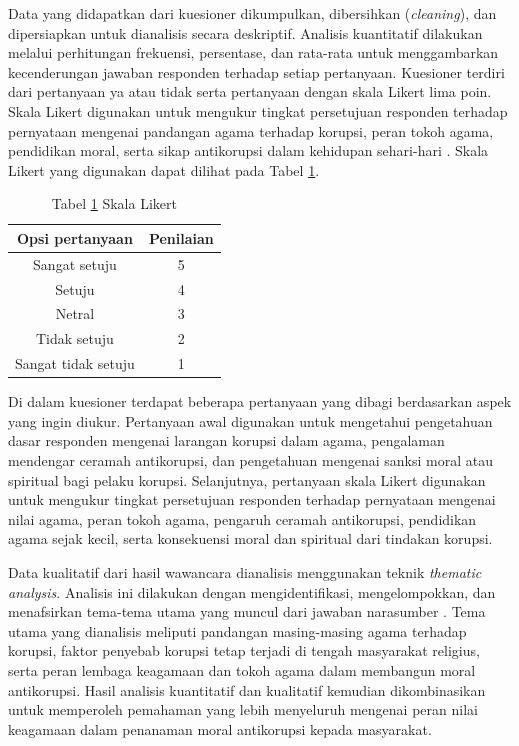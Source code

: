 Data yang didapatkan dari kuesioner dikumpulkan, dibersihkan (\textit{cleaning}), dan dipersiapkan untuk dianalisis secara deskriptif. Analisis kuantitatif dilakukan melalui perhitungan frekuensi, persentase, dan rata-rata untuk menggambarkan kecenderungan jawaban responden terhadap setiap pertanyaan. Kuesioner terdiri dari pertanyaan ya atau tidak serta pertanyaan dengan skala Likert lima poin. Skala Likert digunakan untuk mengukur tingkat persetujuan responden terhadap pernyataan mengenai pandangan agama terhadap korupsi, peran tokoh agama, pendidikan moral, serta sikap antikorupsi dalam kehidupan sehari-hari \citep{alkharusi2022}. Skala Likert yang digunakan dapat dilihat pada Tabel \ref{tab:TabelSkalalikert}.
\begin{table}[h]
    \centering
    \vspace{10pt} %
    \captionsetup{labelformat=empty}
    \caption[Skala Likert]{Tabel \ref{tab:TabelSkalalikert} Skala Likert}
    \begin{tabular}{ |c|c| }
        \hline
        \textbf{Opsi pertanyaan} & \textbf{Penilaian} \\
        \hline
        Sangat setuju & 5 \\
        \hline
        Setuju & 4 \\
        \hline
        Netral & 3 \\
        \hline
        Tidak setuju & 2 \\
        \hline
        Sangat tidak setuju & 1 \\
        \hline
    \end{tabular}
    \label{tab:TabelSkalalikert}
\end{table}

\newpage

\begin{sloppypar}
Di dalam kuesioner terdapat beberapa pertanyaan yang dibagi berdasarkan aspek yang ingin diukur. Pertanyaan awal digunakan untuk mengetahui pengetahuan dasar responden mengenai larangan korupsi dalam agama, pengalaman mendengar ceramah antikorupsi, dan pengetahuan mengenai sanksi moral atau spiritual bagi pelaku korupsi. Selanjutnya, pertanyaan skala Likert digunakan untuk mengukur tingkat persetujuan responden terhadap pernyataan mengenai nilai agama, peran tokoh agama, pengaruh ceramah antikorupsi, pendidikan agama sejak kecil, serta konsekuensi moral dan spiritual dari tindakan korupsi.
\end{sloppypar}

Data kualitatif dari hasil wawancara dianalisis menggunakan teknik \textit{thematic analysis}. Analisis ini dilakukan dengan mengidentifikasi, mengelompokkan, dan menafsirkan tema-tema utama yang muncul dari jawaban narasumber \citep{christou2023}. Tema utama yang dianalisis meliputi pandangan masing-masing agama terhadap korupsi, faktor penyebab korupsi tetap terjadi di tengah masyarakat religius, serta peran lembaga keagamaan dan tokoh agama dalam membangun moral antikorupsi. Hasil analisis kuantitatif dan kualitatif kemudian dikombinasikan untuk memperoleh pemahaman yang lebih menyeluruh mengenai peran nilai keagamaan dalam penanaman moral antikorupsi kepada masyarakat.
